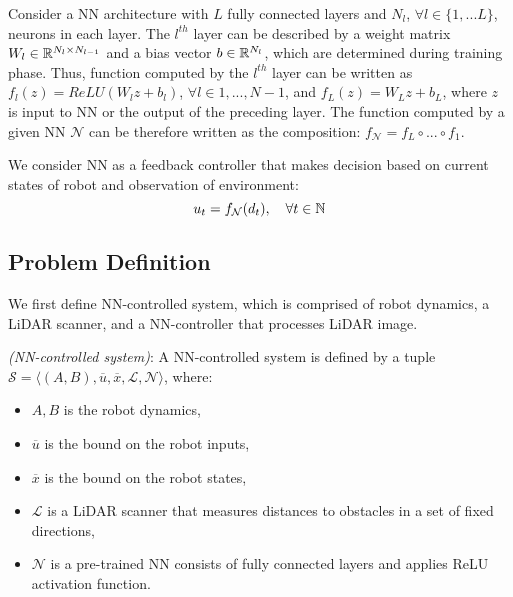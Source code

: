 Consider a NN architecture with $L$ fully connected layers and $N_l$, $\forall l \in \{1,...L\}$, neurons in each layer.
The $l^{th}$ layer can be described by a weight matrix $W_l \in {\mathbb{R}}^{N_l \times N_{l-1}}$ and a bias vector $b \in {\mathbb{R}}^{N_l}$,
which are determined during training phase.
Thus, function computed by the $l^{th}$ layer can be written as $f_l(z) = ReLU(W_l z + b_l)$, $\forall l \in {1, ..., N-1}$, 
and $f_L(z) = W_L z + b_L$, where $z$ is input to NN or the output of the preceding layer.
The function computed by a given NN $\mathcal{N}$ can be therefore written as the composition: 
$f_{\mathcal{N}} = f_L \circ ... \circ f_1$.

We consider NN as a feedback controller that makes decision based on current states of robot and observation of environment:
\begin{equation}    
    \label{eq:nn_nonlinear}    
    u_t = f_{\mathcal{N}}(d_t), \quad \forall t \in {\mathbb{N}}
\end{equation}    





\subsection{Problem Definition}
We first define NN-controlled system, which is comprised of robot dynamics, a LiDAR scanner, 
and a NN-controller that processes LiDAR image.

\begin{definition}
    \textit{(NN-controlled system)}: 
    A NN-controlled system is defined by a tuple 
    $\mathcal{S} = \langle (A, B), \overline{u}, \overline{x}, \mathcal{L}, \mathcal{N} \rangle$, where:
    \begin{itemize} 
        \item ${A, B}$ is the robot dynamics,
        \item $\overline{u}$ is the bound on the robot inputs,
        \item $\overline{x}$ is the bound on the robot states,
        \item $\mathcal{L}$ is a LiDAR scanner that measures distances to obstacles in a set of fixed directions,
        \item $\mathcal{N}$ is a pre-trained NN consists of fully connected layers and applies ReLU activation function.
    \end{itemize}
\end{definition}    


